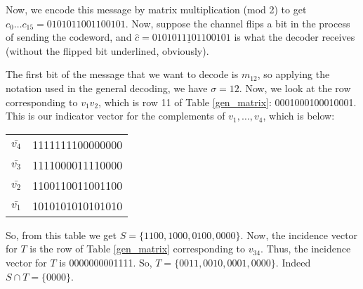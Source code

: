 \documentclass[12pt,twoside]{reedthesis}
\theoremstyle{definition}
\begin{document}
Now, we encode this message by matrix multiplication (mod 2) to get $c_0 \ldots c_{15} = 0101011001100101$. Now, suppose the channel flips a bit in the process of sending the codeword, and $\hat{c} = 0101011\underline{1}01100101$ is what the decoder receives (without the flipped bit underlined, obviously).

The first bit of the message that we want to decode is $m_{12}$, so applying the notation used in the general decoding, we have $\sigma = 12$. Now, we look at the row corresponding to $v_1v_2$, which is row 11 of Table \ref{gen_matrix}: 0001000100010001. This is our indicator vector for the complements of $v_1, \ldots,v_4$, which is below:

\begin{center}
\begin{tabular}{ c | c  }
$\bar{v_4}$ & 1111111100000000\\
$\bar{v_3}$ & 1111000011110000 \\ 
$\bar{v_2}$ & 1100110011001100\\
$\bar{v_1}$ & 1010101010101010 
\end{tabular}
\end{center}
So, from this table we get $S =\{1100, 1000, 0100, 0000\}$. Now, the incidence vector for $T$ is the row of Table \ref{gen_matrix} corresponding to $v_{34}$. Thus, the incidence vector for $T$ is 0000000001111. So, $T = \{0011,0010, 0001, 0000\}$. Indeed $S \cap T = \{0000\}$. 
\end{document}
